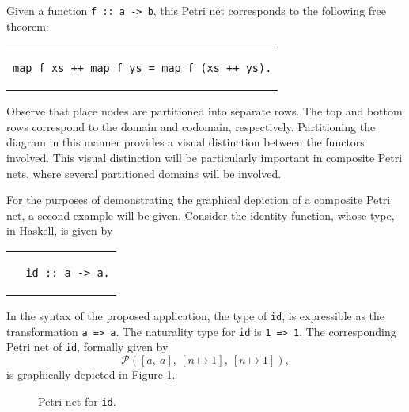 \documentclass[../Dissertation.tex]{subfiles}
\begin{document}
Given a function \lstinline{f :: a -> b}, this Petri net corresponds to the following free theorem:
\begin{center}
\begin{tabular}{c}
\begin{lstlisting}
map f xs ++ map f ys = map f (xs ++ ys).
\end{lstlisting}
\end{tabular}
\end{center}
Observe that place nodes are partitioned into separate rows. The top and bottom rows correspond to the domain and codomain, respectively. Partitioning the diagram in this manner provides a visual distinction between the functors involved. This visual distinction will be particularly important in composite Petri nets, where several partitioned domains will be involved.
\par
For the purposes of demonstrating the graphical depiction of a composite Petri net, a second example will be given. Consider the identity function, whose type, in Haskell, is given by 
\begin{center}
\begin{tabular}{c}
\begin{lstlisting}
  id :: a -> a.
\end{lstlisting}
\end{tabular}
\end{center}
In the syntax of the proposed application, the type of \lstinline{id}, is expressible as the transformation \lstinline{a => a}.  The naturality type for \lstinline{id} is \lstinline{1 => 1}. The corresponding Petri net of \lstinline{id}, formally given by
\begin{equation*}
  \mathcal{P}([a,\ a],\ [n \mapsto 1],\ [n \mapsto 1]),
\end{equation*}
is graphically depicted in Figure \ref{fig:petriid}.
\begin{figure}[H]
  \begin{center}
  \end{center}
  \caption{Petri net for \lstinline{id}.}
  \label{fig:petriid}
\end{figure}
\end{document}

